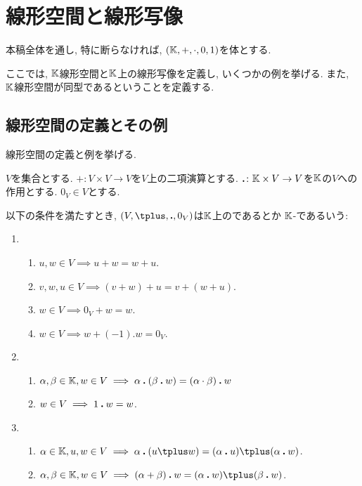 \chapter{線形空間と線形写像}
\label{chap:linspace:linmap}
本稿全体を通し,
特に断らなければ,
$(\mathbb{K},+,\cdot,0,1)$を体とする.

ここでは, $\mathbb{K}$線形空間と$\mathbb{K}$上の線形写像を定義し,
いくつかの例を挙げる.
また, $\mathbb{K}$線形空間が同型であるということを定義する.

\section{線形空間の定義とその例}
\label{sec:linspace:def}

線形空間の定義と例を挙げる.

\begin{definition}
\label{def:vecsp}
  $V$を集合とする.
  $\plus\colon V\times V \to V$を$V$上の二項演算とする.
  $\mathbin{\boldsymbol{.}} \colon \mathbb{K}\times V \to V$を$\mathbb{K}$の$V$への作用とする.
  $0_V \in V$とする.

  以下の条件を満たすとき,
  $(V,\plus,\act ,0_V)$は$\mathbb{K}$上のであるとか
  $\mathbb{K}$-であるいう:
  \begin{enumerate}
  \item 
    \begin{enumerate}
      \label{def:vecsp:item:com}
    \item $u,w \in V\implies  u\plus w=w\plus u$.
    \item
      \label{def:vecsp:item:sum:ass}
      $v,w,u\in V \implies (v\plus w)\plus u=v\plus (w\plus u)$.
    \item $w\in V \implies 0_V\plus w=w$.
    \item $w\in V\implies w\plus (-1).w=0_V$.%
    \end{enumerate}
  \item
    \begin{enumerate}
    \item
      \label{def:vecsp:item:prod:ass}
      $\alpha,\beta\in\mathbb{K}, w\in V \implies \alpha\mathbin{\boldsymbol{.}} (\beta \mathbin{\boldsymbol{.}} w)=(\alpha\cdot \beta)\mathbin{\boldsymbol{.}} w$
    \item $w\in V \implies 1\mathbin{\boldsymbol{.}} w=w$.
    \end{enumerate}
  \item
    \begin{enumerate}
    \item
      \label{def:vecsp:item:dist:r}
$\alpha\in \KK,u,w\in V \implies \alpha\act (u\plus w)=(\alpha\act u)\plus (\alpha\act w)$.
    \item
      \label{def:vecsp:item:dist:l}
$\alpha,\beta\in\KK, w\in V\implies (\alpha+\beta)\act w=(\alpha\act w)\plus (\beta\act w)$.
    \end{enumerate}
  \end{enumerate}
\end{definition}
